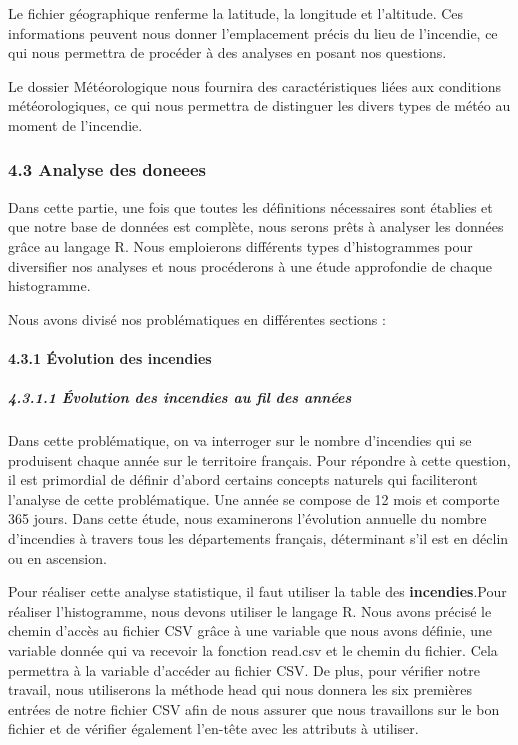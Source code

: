 \documentclass[
]{article}
\begin{document}
Le fichier géographique renferme la latitude, la longitude et
l'altitude. Ces informations peuvent nous donner l'emplacement précis du
lieu de l'incendie, ce qui nous permettra de procéder à des analyses en
posant nos questions.

Le dossier Météorologique nous fournira des caractéristiques liées aux
conditions météorologiques, ce qui nous permettra de distinguer les
divers types de météo au moment de l'incendie.

\subsubsection{4.3 Analyse des doneees}\label{analyse-des-doneees}

Dans cette partie, une fois que toutes les définitions nécessaires sont
établies et que notre base de données est complète, nous serons prêts à
analyser les données grâce au langage R. Nous emploierons différents
types d'histogrammes pour diversifier nos analyses et nous procéderons à
une étude approfondie de chaque histogramme.

Nous avons divisé nos problématiques en différentes sections :

\paragraph{4.3.1 Évolution des
incendies}\label{uxe9volution-des-incendies}

\subparagraph{4.3.1.1 Évolution des incendies au fil des
années}\label{uxe9volution-des-incendies-au-fil-des-annuxe9es}

Dans cette problématique, on va interroger sur le nombre d'incendies qui
se produisent chaque année sur le territoire français. Pour répondre à
cette question, il est primordial de définir d'abord certains concepts
naturels qui faciliteront l'analyse de cette problématique. Une année se
compose de 12 mois et comporte 365 jours. Dans cette étude, nous
examinerons l'évolution annuelle du nombre d'incendies à travers tous
les départements français, déterminant s'il est en déclin ou en
ascension.

Pour réaliser cette analyse statistique, il faut utiliser la table des
\textbf{incendies}.Pour réaliser l'histogramme, nous devons utiliser le
langage R. Nous avons précisé le chemin d'accès au fichier CSV grâce à
une variable que nous avons définie, une variable donnée qui va recevoir
la fonction read.csv et le chemin du fichier. Cela permettra à la
variable d'accéder au fichier CSV. De plus, pour vérifier notre travail,
nous utiliserons la méthode head qui nous donnera les six premières
entrées de notre fichier CSV afin de nous assurer que nous travaillons
sur le bon fichier et de vérifier également l'en-tête avec les attributs
à utiliser.
\end{document}
